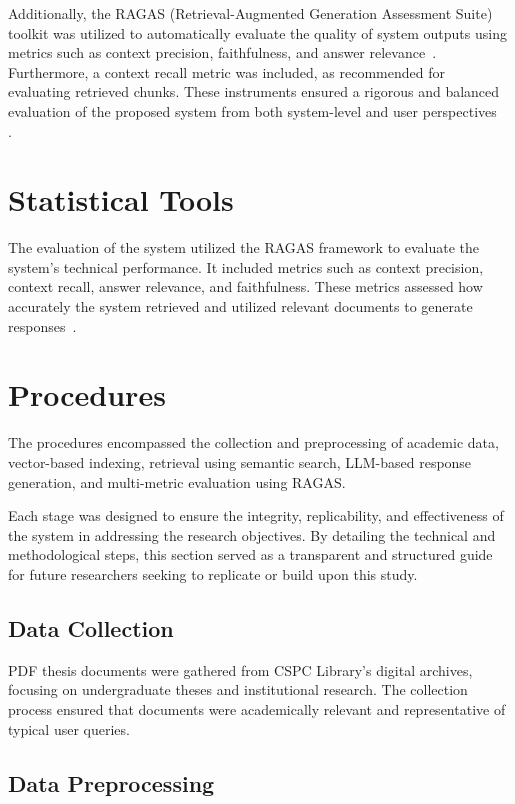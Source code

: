 \begin{refsection}
Additionally, the RAGAS (Retrieval-Augmented Generation Assessment Suite) toolkit was utilized to automatically evaluate the quality of system outputs using metrics such as context precision, faithfulness, and answer relevance~\cite{shinn2023ragas}. Furthermore, a context recall metric was included, as recommended for evaluating retrieved chunks. These instruments ensured a rigorous and balanced evaluation of the proposed system from both system-level and user perspectives~ \cite{lin2021bert}.

\section{Statistical Tools}

The evaluation of the system utilized the RAGAS framework to evaluate the system's technical performance. It included metrics such as context precision, context recall, answer relevance, and faithfulness. These metrics assessed how accurately the system retrieved and utilized relevant documents to generate responses~\cite{holmes2023chatbot, ameli2024ranking, lin2024satisfaction}.

\section{Procedures}

The procedures encompassed the collection and preprocessing of academic data, vector-based indexing, retrieval using semantic search, LLM-based response generation, and multi-metric evaluation using RAGAS.

Each stage was designed to ensure the integrity, replicability, and effectiveness of the system in addressing the research objectives. By detailing the technical and methodological steps, this section served as a transparent and structured guide for future researchers seeking to replicate or build upon this study.

\subsection*{Data Collection}

PDF thesis documents were gathered from CSPC Library’s digital archives, focusing on undergraduate theses and institutional research. The collection process ensured that documents were academically relevant and representative of typical user queries.

\subsection{Data Preprocessing}


\end{refsection}
